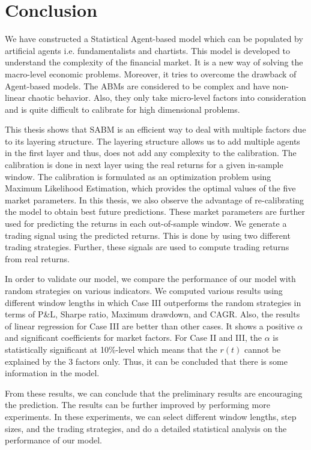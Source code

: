 
\chapter{Conclusion}
We have constructed a Statistical Agent-based model which can be populated by artificial agents i.e. fundamentalists and chartists. This model is developed to understand the complexity of the financial market. It is a new way of solving the macro-level economic problems. Moreover, it tries to overcome the drawback of  Agent-based models. The ABMs are considered to be complex and have non-linear chaotic behavior. Also, they only take micro-level factors into consideration and is quite difficult to calibrate for high dimensional problems.

This thesis shows that SABM is an efficient way to deal with multiple factors due to its layering structure. The layering structure allows us to add multiple agents in the first layer and thus, does not add any complexity to the calibration. The calibration is done in next layer using the real returns for a given in-sample window. The calibration is formulated as an optimization problem using Maximum Likelihood Estimation, which provides the optimal values of the five market parameters. In this thesis, we also observe the advantage of re-calibrating the model to obtain best future predictions. These market parameters are further used for predicting the returns in each out-of-sample window. We generate a trading signal using the predicted returns. This is done by using two different trading strategies. Further, these signals are used to compute trading returns from real returns. 

In order to validate our model, we compare the performance of our model with random strategies on various indicators. We computed various results using different window lengths in which Case III outperforms the random strategies in terms of P\&L, Sharpe ratio, Maximum drawdown, and CAGR. Also, the results of linear regression for Case III are better than other cases. It shows a positive $\alpha$ and significant coefficients for market factors. For Case II and III, the $\alpha$ is statistically significant at 10\%-level which means that the $r(t)$ cannot be
explained by the 3 factors only. Thus, it can be concluded that there is some information in the model.

From these results, we can conclude that the preliminary results are encouraging the prediction. The results can be further improved by performing more experiments. In these experiments, we can select different window lengths, step sizes, and the trading strategies, and do a detailed statistical analysis on the performance of our model.